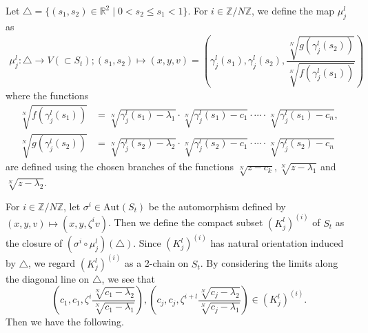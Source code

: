 \documentclass[letterpaper, 11pt]{amsart}
\theoremstyle{my theoremstyle}
\theoremstyle{dfn}
\theoremstyle{remark}
\renewcommand{\1}{\mathbbm{1}}
\newcommand{\Z}{\mathbb{Z}}
\newcommand{\R}{\mathbb{R}}
\renewcommand{\l}{\lambda}
\newcommand{\Aut}{{\mathrm{Aut}}}
\numberwithin{equation}{section}
\begin{document}
Let $\triangle = \{(s_1,s_2)\in \R^2\mid 0< s_2\le s_1 < 1\}$.
For $i\in \Z/N\Z$, we define the map $\mu_j^l$ as
\begin{align*}
\mu_{j}^l\colon\triangle \to V (\subset S_t);(s_1, s_2) \mapsto (x, y, v)= \left(\gamma_j^l(s_1), \gamma_j^l(s_2), 
\dfrac{\sqrt[N]{g(\gamma_j^l(s_2))}}{\sqrt[N]{f(\gamma_j^l(s_1))}}\right)
\end{align*}
where the functions 
\begin{equation}\label{branchsqrt}
\begin{aligned}
\sqrt[N]{f(\gamma_j^l(s_1))} & = \sqrt[N]{\gamma_j^l(s_1)-\l_1}\cdot\sqrt[N]{\gamma_j^l(s_1)-c_1} \cdot \cdots \cdot \sqrt[N]{\gamma_j^l(s_1)-c_n}, \\
\sqrt[N]{g(\gamma_j^l(s_2))} &= \sqrt[N]{\gamma_j^l(s_2)-\l_2}\cdot\sqrt[N]{\gamma_j^l(s_2)-c_1} \cdot \cdots \cdot \sqrt[N]{\gamma_j^l(s_2)-c_n}
\end{aligned}
\end{equation}
are defined using the chosen branches of the functions $\sqrt[N]{z-c_k}, \sqrt[N]{z-\l_1}$ and $\sqrt[N]{z-\l_2}$.

For $i\in \Z/N\Z$, let $\sigma^i\in \Aut(S_t)$ be the automorphism defined by $(x,y,v)\mapsto (x,y,\zeta^iv)$.
Then we define the compact subset $(K_{j}^l)^{(i)}$ of $S_t$ as the closure of $(\sigma^i\circ\mu_{j}^l)(\triangle)$.
Since $(K_{j}^l)^{(i)}$ has natural orientation induced by $\triangle$, we regard $(K_{j}^l)^{(i)}$ as a 2-chain on $S_t$.
By considering the limits along the diagonal line on $\triangle$, we see that 
\begin{equation*}
\left(c_1,c_1,\zeta^i\dfrac{\sqrt[N]{c_1-\l_2}}{\sqrt[N]{c_1-\l_1}}\right),\left(c_j,c_j,\zeta^{i+l}\dfrac{\sqrt[N]{c_j-\l_2}}{\sqrt[N]{c_j-\l_1}}\right)\in (K^l_j)^{(i)}.
\end{equation*}
Then we have the following.
\end{document}
